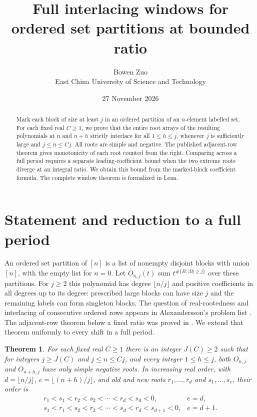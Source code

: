 \documentclass[10pt]{article}
\title{Full interlacing windows for ordered set partitions at bounded ratio}
\author{Bowen Zuo\\[2pt]\small East China University of Science and Technology}
\date{27 November 2026}
\newtheorem{theorem}{Theorem}
\begin{document}
\maketitle
\begin{abstract}
Mark each block of size at least $j$ in an ordered partition of an $n$-element labelled set. For each fixed real $C\ge1$, we prove that the entire root arrays of the resulting polynomials at $n$ and $n+h$ strictly interlace for all $1\le h\le j$, whenever $j$ is sufficiently large and $j\le n\le Cj$. All roots are simple and negative. The published adjacent-row theorem gives monotonicity of each root counted from the right. Comparing across a full period requires a separate leading-coefficient bound when the two extreme roots diverge at an integral ratio. We obtain this bound from the marked-block coefficient formula. The complete window theorem is formalized in Lean.
\end{abstract}

\section{Statement and reduction to a full period}
An ordered set partition of $[n]$ is a list of nonempty disjoint blocks with union $[n]$, with the empty list for $n=0$. Let $O_{n,j}(t)$ sum $t^{\#\{B:|B|\ge j\}}$ over these partitions. For $j\ge2$ this polynomial has degree $\lfloor n/j\rfloor$ and positive coefficients in all degrees up to its degree: prescribed large blocks can have size $j$ and the remaining labels can form singleton blocks. The question of real-rootedness and interlacing of consecutive ordered rows appears in Alexandersson's problem list \cite{alex}. The adjacent-row theorem below a fixed ratio was proved in \cite{adjacent}. We extend that theorem uniformly to every shift in a full period.

\begin{theorem}\label{thm:window}
For each fixed real $C\ge1$ there is an integer $J(C)\ge2$ such that for integers $j\ge J(C)$ and $j\le n\le Cj$, and every integer $1\le h\le j$, both $O_{n,j}$ and $O_{n+h,j}$ have only simple negative roots. In increasing real order, with $d=\lfloor n/j\rfloor$, $e=\lfloor(n+h)/j\rfloor$, and old and new roots $r_1,\ldots,r_d$ and $s_1,\ldots,s_e$, their order is
\[
\begin{array}{ll}
r_1<s_1<r_2<s_2<\cdots<r_d<s_d<0, & e=d,\\[2pt]
s_1<r_1<s_2<r_2<\cdots<s_d<r_d<s_{d+1}<0, & e=d+1.
\end{array}
\]
\end{theorem}
\end{document}
